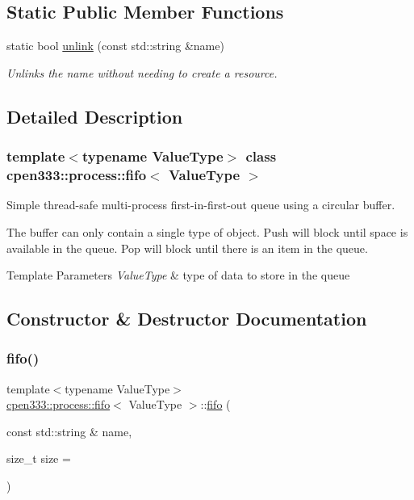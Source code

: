 \subsection*{Static Public Member Functions}
\begin{DoxyCompactItemize}
\item 
static bool \hyperlink{classcpen333_1_1process_1_1fifo_a893a14908a88de202fe2804dd890f958}{unlink} (const std\+::string \&name)
\begin{DoxyCompactList}\small\item\em Unlinks the name without needing to create a resource. \end{DoxyCompactList}\end{DoxyCompactItemize}


\subsection{Detailed Description}
\subsubsection*{template$<$typename Value\+Type$>$\newline
class cpen333\+::process\+::fifo$<$ Value\+Type $>$}

Simple thread-\/safe multi-\/process first-\/in-\/first-\/out queue using a circular buffer. 

The buffer can only contain a single type of object. Push will block until space is available in the queue. Pop will block until there is an item in the queue. 
\begin{DoxyTemplParams}{Template Parameters}
{\em Value\+Type} & type of data to store in the queue \\
\hline
\end{DoxyTemplParams}


\subsection{Constructor \& Destructor Documentation}
\mbox{\label{classcpen333_1_1process_1_1fifo_abbac3b7b35974927626c0fc96540a5c9}} 
\subsubsection{\texorpdfstring{fifo()}{fifo()}}
{\footnotesize\ttfamily template$<$typename Value\+Type$>$ \\
\hyperlink{classcpen333_1_1process_1_1fifo}{cpen333\+::process\+::fifo}$<$ Value\+Type $>$\+::\hyperlink{classcpen333_1_1process_1_1fifo}{fifo} (\begin{DoxyParamCaption}\item[{const std\+::string \&}]{name,  }\item[{size\+\_\+t}]{size = {} }\end{DoxyParamCaption})\hspace{0.3cm}{\ttfamily [inline]}}



